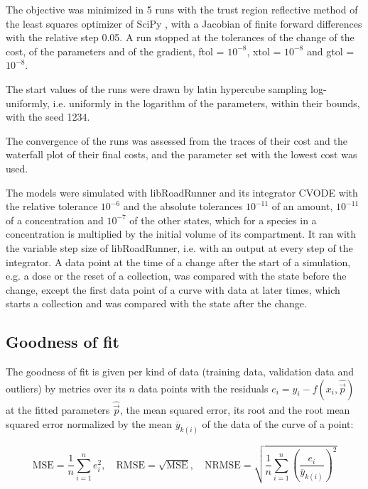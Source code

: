 \documentclass{article}
\begin{document}
The objective was minimized in 5 runs with the trust region reflective method \cite{Branch1999} of the least squares optimizer of SciPy \cite{Virtanen2020}, with a Jacobian of finite forward differences with the relative step 0.05. A run stopped at the tolerances of the change of the cost, of the parameters and of the gradient, ftol = $10^{-8}$, xtol = $10^{-8}$ and gtol = $10^{-8}$.

The start values of the runs were drawn by latin hypercube sampling \cite{McKay1979} log-uniformly, i.e. uniformly in the logarithm of the parameters, within their bounds, with the seed 1234.

The convergence of the runs was assessed from the traces of their cost and the waterfall plot of their final costs, and the parameter set with the lowest cost was used.

The models were simulated with libRoadRunner \cite{Welsh2023} and its integrator CVODE \cite{Hindmarsh2005} with the relative tolerance $10^{-6}$ and the absolute tolerances $10^{-11}$ of an amount, $10^{-11}$ of a concentration and $10^{-7}$ of the other states, which for a species in a concentration is multiplied by the initial volume of its compartment. It ran with the variable step size of libRoadRunner, i.e. with an output at every step of the integrator. A data point at the time of a change after the start of a simulation, e.g. a dose or the reset of a collection, was compared with the state before the change, except the first data point of a curve with data at later times, which starts a collection and was compared with the state after the change.

\subsection{Goodness of fit}

The goodness of fit is given per kind of data (training data, validation data and outliers) by metrics over its $n$ data points with the residuals $e_i = y_i - f(x_i, \hat{\vec{p}})$ at the fitted parameters $\hat{\vec{p}}$, the mean squared error, its root and the root mean squared error normalized by the mean $\overline{y}_{k(i)}$ of the data of the curve of a point:

\begin{equation}
\mathrm{MSE} = \frac{1}{n} \sum_{i=1}^{n} e_i^2, \quad \mathrm{RMSE} = \sqrt{\mathrm{MSE}}, \quad \mathrm{NRMSE} = \sqrt{\frac{1}{n} \sum_{i=1}^{n} \left(\frac{e_i}{\overline{y}_{k(i)}}\right)^2}
\end{equation}
\end{document}
